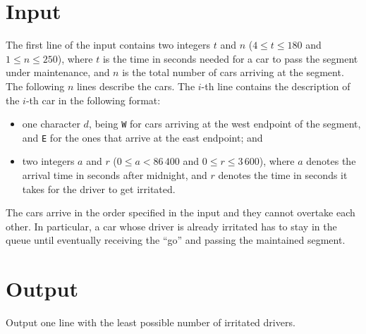 \section*{Input}
The first line of the input contains two integers $t$ and $n$ ($4 \leq t \leq 180$ and $1\leq n\leq 250$), where $t$ is the time in seconds needed for a car to pass the segment under maintenance, and $n$ is the total number of cars arriving at the segment.
The following $n$ lines describe the cars. The $i$-th line contains the description of the $i$-th car in the following format:
\begin{itemize}
\item one character $d$, being \verb!W! for cars arriving at the west endpoint of the segment, and \verb!E! for the ones that arrive at the east endpoint; and
\item two integers $a$ and $r$ ($0 \leq a < 86\, 400$ and $0 \leq r \leq 3\, 600$), where $a$ denotes the arrival time in seconds after midnight, and $r$ denotes the time in seconds it takes for the driver to get irritated.
\end{itemize}
The cars arrive in the order specified in the input and they cannot overtake each other.
In particular, a car whose driver is already irritated has to stay in the queue until eventually receiving the ``go'' and passing the maintained segment.

\section*{Output}
Output one line with the least possible number of irritated drivers.
